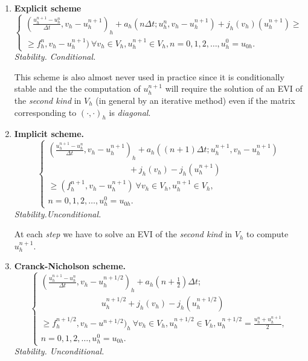 \begin{enumerate}
\item  {\bf Explicit scheme}\pageoriginale 
{\fontsize{10}{12}\selectfont
\begin{equation}
\begin{cases}
(\frac{u^{n+1}_h -u^n_h} {\Delta  t} , v_h -u^{n+1}_h)_h + a_h (n
  \Delta  t ; u^{n}_h, v_h - u^{n+1}_h) + j_h (v_h) (u^{n+1}_h) \geq
  \\ 
  \geq f^{n}_h, v_h - u^{n+1}_h) \ \forall v_h \in V_h, u^{n+1}_h \in
  V_h, n=0,1,2,\ldots, u^0_h = u_{0h}. \tag{5.1}\label{c3:eq5.1} 
\end{cases}
\end{equation}}\relax
\textit { Stability. Conditional.}

This scheme is also almost never used in practice since it is
conditionally stable and the the computation of $u^{n+1}_h$ will
require the solution of an EVI of the \textit {second kind} in $V_h$
(in general by an iterative method) even if the matrix corresponding
to $(\cdot ,  \cdot)_h$ is \textit {diagonal}. 

\item {\bf Implicit scheme.}
\begin{equation}
\begin{cases}
\left(\frac{u^{n+1}_h -u^n_h} {\Delta  t}, v_h -u^{n+1}_h\right)_h +
a_h ((n+1) \Delta  t ; u^{n+1}_h, v_h - u^{n+1}_h)\\ 
\hspace{4cm}+ j_h (v_h)-j_h
(u^{n+1}_h) \\ 
\geq \left(f^{n+1}_h, v_h - u^{n+1}_h\right) \ \forall v_h \in V_h,
u^{n+1}_h \in V_h,\\ 
n =0, 1, 2, \ldots, u^0_h = u_{0h}. \tag{5.2}\label{c3:eq5.2}
\end{cases}
\end{equation}
\textit{Stability.Unconditional.}

At each \textit{step} we have to solve an EVI of the \textit {second kind} in $V_h$ to compute $u^{n+1}_h$.

\item {\bf Cranck-Nicholson scheme.} 
{\fontsize{10}{12}\selectfont
\begin{equation}
\begin{cases}
(\frac{u^{n+1}_h -u^n_h} {\Delta  t}, v_h -u^{n+1/2}_h)_h + a_h (n+
  \frac{1}{2}) \Delta  t ;\\ 
  \hspace{3cm}u^{n+1/2}_h +j_h (v_h) - j_h (u^{n+1/2}_h)
  \\ 
 \geq f^{n+1/2}_h, v_h - u^{n+1/2})_h \ \forall v_h \in V_h, u^{n+1/2}_h \in V_h,  u^{n+1/2}_h = \frac {u^n_h + u^{n+1}_h} {2},\\
  n=0,1,2,\ldots, u^0_h = u_{0h}.\tag{5.3}\label{c3:eq5.3}
\end{cases}
\end{equation}}\relax
\textit {Stability. Unconditional.}


\end{enumerate}
